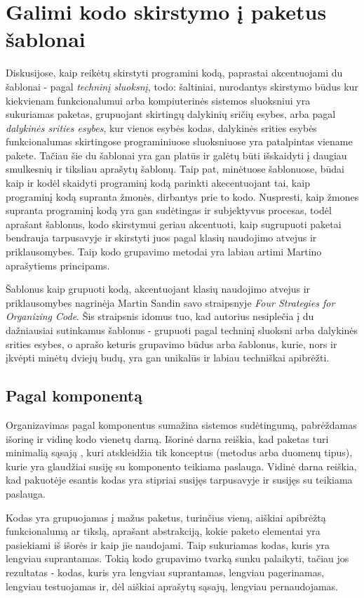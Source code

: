 \section{Galimi kodo skirstymo į paketus šablonai}
Diskusijose, kaip reikėtų skirstyti programini kodą, paprastai akcentuojami du šablonai - pagal \textit{techninį sluoksnį}, todo: šaltiniai, nurodantys skirstymo būdus
kur kiekvienam funkcionalumui arba kompiuterinės sistemos sluoksniui yra sukuriamas paketas,
grupuojant skirtingų dalykinių sričių esybes, arba pagal \textit{dalykinės srities esybes}, kur vienos esybės kodas, dalykinės srities
esybės funkcionalumas skirtingose programiniuose sluoksniuose yra patalpintas viename pakete.
Tačiau šie du šablonai yra gan platūs ir galėtų būti išskaidyti į daugiau smulkesnių ir tiksliau aprašytų šablonų.
Taip pat, minėtuose šablonuose, būdai kaip ir kodėl skaidyti programinį kodą parinkti akecentuojant tai, kaip programinį
kodą supranta žmonės, dirbantys prie to kodo.
Nuspresti, kaip žmones supranta programinį kodą yra gan sudėtingas ir subjektyvus procesas, todėl aprašant šablonus, kodo skirstymui
geriau akcentuoti, kaip sugrupuoti paketai bendrauja tarpusavyje ir skirstyti juos pagal klasių naudojimo atvejus ir priklausomybes.
Taip kodo grupavimo metodai yra labiau artimi Martino aprašytiems principams.


Šablonus kaip grupuoti kodą, akcentuojant klasių naudojimo atvejus ir priklausomybes nagrinėja Martin Sandin savo
straipsnyje \textit{Four Strategies for Organizing Code}.
Šis straipsnis idomus tuo, kad autorius nesiplečia į du dažniausiai sutinkamus šablonus - grupuoti pagal techninį sluoksni arba dalykinės srities esybes,
o aprašo keturis grupavimo būdus arba šablonus, kurie, nors ir įkvėpti minėtų dviejų budų, yra gan unikalūs ir labiau techniškai apibrėžti.
\subsection{Pagal komponentą}
Organizavimas pagal komponentus sumažina sistemos sudėtingumą, pabrėždamas išorinę ir vidinę kodo vienetų darną.
Išorinė darna reiškia, kad paketas turi minimalią sąsają , kuri atskleidžia tik konceptus (metodus arba duomenų tipus),
kurie yra glaudžiai susiję su komponento teikiama paslauga.
Vidinė darna reiškia, kad pakuotėje esantis kodas yra stipriai susijęs tarpusavyje ir susijęs su teikiama paslauga.

Kodas yra grupuojamas į mažus paketus, turinčius vieną, aiškiai apibrėžtą funkcionalumą ar tikslą, aprašant abstrakciją, kokie paketo elementai
yra pasiekiami iš išorės ir kaip jie naudojami.
Taip sukuriamas kodas, kuris yra lengviau suprantamas.
Tokią kodo grupavimo tvarką sunku palaikyti, tačiau jos rezultatas - kodas, kuris yra lengviau suprantamas, lengviau pagerinamas, lengviau testuojamas
ir, dėl aiškiai aprašytų sąsajų, lengviau pernaudojamas.

